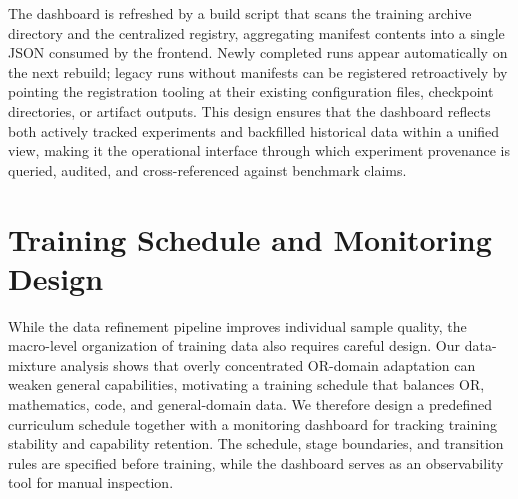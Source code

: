 The dashboard is refreshed by a build script that scans the training archive
directory and the centralized registry, aggregating manifest contents into a
single JSON consumed by the frontend. Newly completed runs appear automatically
on the next rebuild; legacy runs without manifests can be registered
retroactively by pointing the registration tooling at their existing
configuration files, checkpoint directories, or artifact outputs. This design
ensures that the dashboard reflects both actively tracked experiments and
backfilled historical data within a unified view, making it the operational
interface through which experiment provenance is queried, audited, and
cross-referenced against benchmark claims.

\section{Training Schedule and Monitoring Design}
\label{sec:curriculum}

While the data refinement pipeline improves individual sample quality, the
macro-level organization of training data also requires careful design.
Our data-mixture analysis shows that overly concentrated OR-domain adaptation
can weaken general capabilities, motivating a training schedule that balances
OR, mathematics, code, and general-domain data. We therefore design a
predefined curriculum schedule together with a monitoring dashboard for
tracking training stability and capability retention. The schedule, stage
boundaries, and transition rules are specified before training, while the
dashboard serves as an observability tool for manual inspection.






